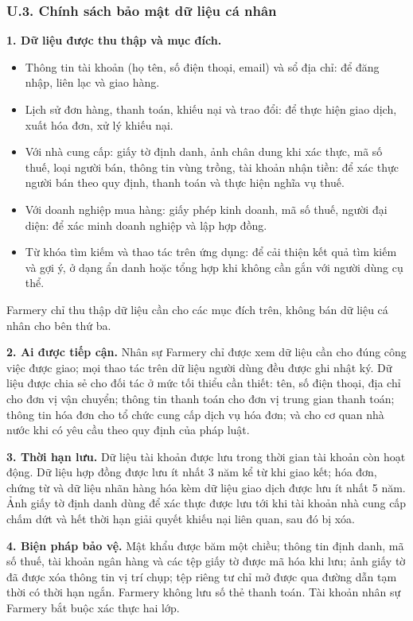 \subsubsection*{U.3. Chính sách bảo mật dữ liệu cá nhân}

\noindent\textbf{1. Dữ liệu được thu thập và mục đích.}
\begin{itemize}
    \item Thông tin tài khoản (họ tên, số điện thoại, email) và sổ địa chỉ:
    để đăng nhập, liên lạc và giao hàng.
    \item Lịch sử đơn hàng, thanh toán, khiếu nại và trao đổi: để thực hiện
    giao dịch, xuất hóa đơn, xử lý khiếu nại.
    \item Với nhà cung cấp: giấy tờ định danh, ảnh chân dung khi xác thực, mã
    số thuế, loại người bán, thông tin vùng trồng, tài khoản nhận tiền: để xác
    thực người bán theo quy định, thanh toán và thực hiện nghĩa vụ thuế.
    \item Với doanh nghiệp mua hàng: giấy phép kinh doanh, mã số thuế, người
    đại diện: để xác minh doanh nghiệp và lập hợp đồng.
    \item Từ khóa tìm kiếm và thao tác trên ứng dụng: để cải thiện kết quả tìm
    kiếm và gợi ý, ở dạng ẩn danh hoặc tổng hợp khi không cần gắn với người
    dùng cụ thể.
\end{itemize}
Farmery chỉ thu thập dữ liệu cần cho các mục đích trên, không bán dữ liệu cá
nhân cho bên thứ ba.

\noindent\textbf{2. Ai được tiếp cận.} Nhân sự Farmery chỉ được xem dữ liệu cần
cho đúng công việc được giao; mọi thao tác trên dữ liệu người dùng đều được
ghi nhật ký. Dữ liệu được chia sẻ cho đối tác ở mức tối thiểu cần thiết: tên,
số điện thoại, địa chỉ cho đơn vị vận chuyển; thông tin thanh toán cho đơn vị
trung gian thanh toán; thông tin hóa đơn cho tổ chức cung cấp dịch vụ hóa
đơn; và cho cơ quan nhà nước khi có yêu cầu theo quy định của pháp luật.

\noindent\textbf{3. Thời hạn lưu.} Dữ liệu tài khoản được lưu trong thời gian
tài khoản còn hoạt động. Dữ liệu hợp đồng được lưu ít nhất 3 năm kể từ khi
giao kết; hóa đơn, chứng từ và dữ liệu nhãn hàng hóa kèm dữ liệu giao dịch
được lưu ít nhất 5 năm. Ảnh giấy tờ định danh dùng để xác thực được lưu tới
khi tài khoản nhà cung cấp chấm dứt và hết thời hạn giải quyết khiếu nại liên
quan, sau đó bị xóa.

\noindent\textbf{4. Biện pháp bảo vệ.} Mật khẩu được băm một chiều; thông tin
định danh, mã số thuế, tài khoản ngân hàng và các tệp giấy tờ được mã hóa khi
lưu; ảnh giấy tờ đã được xóa thông tin vị trí chụp; tệp riêng tư chỉ mở được
qua đường dẫn tạm thời có thời hạn ngắn. Farmery không lưu số thẻ thanh toán.
Tài khoản nhân sự Farmery bắt buộc xác thực hai lớp.

